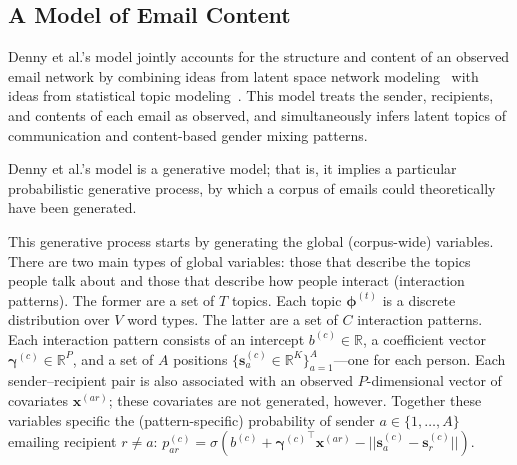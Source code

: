 \documentclass{pnastwo}
\newcommand{\bs}{\boldsymbol{s}}
\newcommand{\bx}{\boldsymbol{x}}
\newcommand{\bgamma}{\boldsymbol{\gamma}}
\newcommand{\bphi}{\boldsymbol{\phi}}
\begin{document}
\begin{article}


\subsection{A Model of Email Content}

Denny et al.'s model jointly accounts for the structure and content of
an observed email network by combining ideas from latent space network
modeling~\cite{Hoff2002a} with ideas from statistical topic
modeling~\cite{Blei2003}. This model treats the sender, recipients,
and contents of each email as observed, and simultaneously infers
latent topics of communication and content-based gender mixing
patterns.

Denny et al.'s model is a generative model; that is, it implies a
particular probabilistic generative process, by which a corpus of
emails could theoretically have been generated.

This generative process starts by generating the global (corpus-wide)
variables. There are two main types of global variables: those that
describe the topics people talk about and those that describe how
people interact (interaction patterns). The former are a set of $T$
topics. Each topic $\bphi^{(t)}$ is a discrete distribution over $V$
word types. The latter are a set of $C$ interaction patterns. Each
interaction pattern consists of an intercept $b^{(c)} \in \mathbb{R}$,
a coefficient vector $\bgamma^{(c)} \in \mathbb{R}^P$, and a set of
$A$ positions $\{ \bs^{(c)}_a \in \mathbb{R}^K \}_{a=1}^A$---one for
each person. Each sender--recipient pair is also associated with an
observed $P$-dimensional vector of covariates $\bx^{(ar)}$; these
covariates are not generated, however. Together these variables
specific the (pattern-specific) probability of sender $a \in \{1,
\ldots, A\}$ emailing recipient $r \neq a$: $p^{(c)}_{ar} =
\sigma(b^{(c)} + {\bgamma^{(c)}}^{\top} \bx^{(ar)} - ||\bs_{a}^{(c)} -
\bs_{r}^{(c)}||)$.


\end{article}
\end{document}
